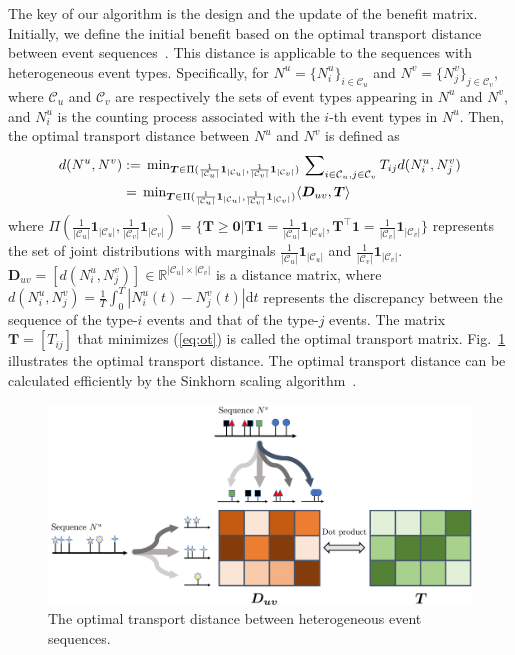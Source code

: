 \documentclass[runningheads]{llncs}
\newcommand{\dd}{\mathrm{d}}
\begin{document}
The key of our algorithm is the design and the update of the benefit matrix. 
Initially, we define the initial benefit based on the optimal transport distance between event sequences~\cite{xu2021hawkes}. 
This distance is applicable to the sequences with heterogeneous event types. 
Specifically, for $N^u=\{N_i^u \}_{i \in \mathcal{C}_u}$ and $N^v=\{N_j^v\}_{j \in \mathcal{C}_v}$, where $\mathcal{C}_u$ and $\mathcal{C}_v$ are respectively the sets of event types appearing in $N^u$ and $N^v$, and $N_i^u$ is the counting process associated with the $i$-th event types in $N^u$. 
Then, the optimal transport distance between $N^u$ and $N^v$ is defined as
\begin{eqnarray}\label{eq:ot}
\begin{aligned}
d(N^u, N^v) 
& := \sideset{}{_{\bm{T} \in \Pi (\frac{1}{|\mathcal{C}_u|} \bm{1}_{|\mathcal{C}_u|}, \frac{1}{|\mathcal{C}_v|} \bm{1}_{|\mathcal{C}_v|})}}\min \sideset{}{_{i \in \mathcal{C}_u, j \in \mathcal{C}_v}}\sum T_{ij} d(N_i^u, N_j^v)\\
&= \sideset{}{_{\bm{T} \in \Pi (\frac{1}{|\mathcal{C}_u|} \bm{1}_{|\mathcal{C}_u|}, \frac{1}{|\mathcal{C}_v|} \bm{1}_{|\mathcal{C}_v|})}}\min \langle \bm{D}_{uv}, \bm{T} \rangle
\end{aligned}    
\end{eqnarray}
where $\Pi (\frac{1}{|\mathcal{C}_u|} \bm{1}_{|\mathcal{C}_u|}, \frac{1}{|\mathcal{C}_v|} \bm{1}_{|\mathcal{C}_v|})=\{\bm{T}\geq \bm{0}|\bm{T}\bm{1}=\frac{1}{|\mathcal{C}_u|} \bm{1}_{|\mathcal{C}_u|}, \bm{T}^{\top}\bm{1}=\frac{1}{|\mathcal{C}_v|} \bm{1}_{|\mathcal{C}_v|}\}$ represents the set of joint distributions with marginals $\frac{1}{|\mathcal{C}_u|} \bm{1}_{|\mathcal{C}_u|}$ and $\frac{1}{|\mathcal{C}_v|} \bm{1}_{|\mathcal{C}_v|}$. 
$\bm{D}_{uv}=[d(N_i^u, N_j^v)] \in \mathbb{R}^{|\mathcal{C}_u| \times |\mathcal{C}_v| }$ is a distance matrix, where $d(N_i^u, N_j^v) = \frac{1}{T} \int_0^T|N_i^u(t) - N_j^v(t)| \dd t$ represents the discrepancy between the sequence of the type-$i$ events and that of the type-$j$ events.
The matrix $\bm{T}=[T_{ij}]$ that minimizes (\ref{eq:ot}) is called the optimal transport matrix. 
Fig.~\ref{fig2} illustrates the optimal transport distance.
The optimal transport distance can be calculated efficiently by the Sinkhorn scaling algorithm~\cite{cuturi2013sinkhorn}.

\begin{figure}[t]
\centerline{\includegraphics[width=0.7\linewidth]{figure2.pdf}}
\vspace{-10pt}
\caption{The optimal transport distance between heterogeneous event sequences.}
\label{fig2}
\end{figure}
\end{document}

